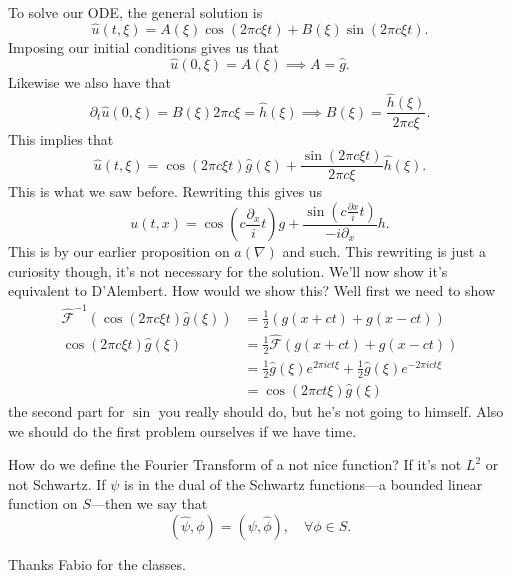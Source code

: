 To solve our ODE, the general solution is
\[ \hat u(t, \xi) = A(\xi) \cos(2 \pi c \xi t) + B(\xi) \sin(2 \pi c \xi t). \]
Imposing our initial conditions gives us that
\[ \hat u(0, \xi) = A(\xi) \implies A = \hat g. \]
Likewise we also have that
\[ \partial_{t} \hat u(0, \xi) = B(\xi) 2 \pi c \xi = \hat h(\xi) \implies B(\xi) = \frac{\hat h(\xi)}{2 \pi c \xi}. \]
This implies that
\[ \hat u(t, \xi) = \cos(2 \pi c \xi t) \hat g(\xi) + \frac{\sin(2 \pi c \xi t)}{2 \pi c \xi}\hat h(\xi). \]
This is what we saw before. Rewriting this gives us
\[ u(t, x) = \cos\left(c \frac{\partial_{x}}{i} t\right)g + \frac{\sin \left( c \frac{\partial x}{i} t \right)}{-i \partial_x} h. \]
This is by our earlier proposition on \( a(\nabla) \) and such. This rewriting is just a curiosity though, it's not necessary for the solution. We'll now show it's equivalent to D'Alembert. How would we show this? Well first we need to show
\begin{align*}
	\hat {\mathcal{F}}^{-1} \left( \cos(2 \pi c \xi t) \hat g(\xi) \right) &= \frac{1}{2} \left( g(x + ct) + g(x - ct) \right) \\
	\cos(2 \pi c \xi t) \hat g(\xi) &= \frac{1}{2} \hat {\mathcal{F}} \left( g(x + ct) + g(x - ct) \right) \\ 
																	&= \frac{1}{2} \hat g(\xi) e^{2 \pi i c t \xi} + \frac{1}{2} \hat g (\xi) e^{- 2 \pi i c t \xi} \\
																	&= \cos(2 \pi c t \xi) \hat g(\xi)
\end{align*}
the second part for \( \sin \) you really should do, but he's not going to himself. Also we should do the first problem ourselves if we have time.

How do we define the Fourier Transform of a not nice function? If it's not \( L^{2} \) or not Schwartz. If \( \psi \) is in the dual of the Schwartz functions---a bounded linear function on \( S \)---then we say that
\[ (\hat \psi, \phi) = (\psi, \hat \phi), \quad \forall \phi \in S. \]

Thanks Fabio for the classes.
